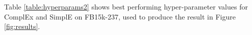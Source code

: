\documentclass[11pt,a4paper]{article}
\begin{document}
Table \ref{table:hyperparams2} shows best performing hyper-parameter values for ComplEx and SimplE on FB15k-237, used to produce the result in Figure \ref{fig:results}.

\begin{table}[!htbp]
\centering
{}
  \caption{Best performing hyper-parameter values for ComplEx and SimplE on FB15k-237.}
    \label{table:hyperparams2}
\end{table}
\end{document}
